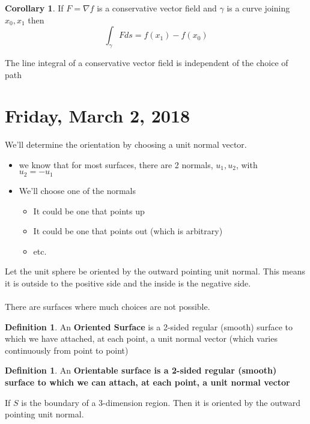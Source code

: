 \documentclass[12pt]{article}
\theoremstyle{plain}
\theoremstyle{definition}
\newtheorem{definition}[theorem]{Definition}
\newtheorem{corollary}[theorem]{Corollary}
\begin{document}
\begin{corollary}
	If $F = \nabla f$ is a conservative vector field and $\gamma$ is a curve joining $x_0, x_1$ then
	$$\int_\gamma Fds = f(x_1) - f(x_0)$$
\end{corollary}

The line integral of a conservative vector field is independent of the choice of path

\newpage

\section{Friday, March 2, 2018}

We'll determine the orientation by choosing a unit normal vector.
\begin{itemize}
	\item{we know that for most surfaces, there are 2 normals, $u_1, u_2$, with\\ $u_2 = -u_1$}
	\item{We'll choose one of the normals}
	\begin{itemize}
		\item{It could be one that points up}
		\item{It could be one that points out (which is arbitrary)}
		\item{etc.}
	\end{itemize}
\end{itemize}

Let the unit sphere be oriented by the outward pointing unit normal. This means it is outside to the positive side and the inside is the negative side.\\
\\
There are surfaces where much choices are not possible.

\begin{definition}
	An \textbf{Oriented Surface} is a 2-sided regular (smooth) surface to which we have attached, at each point, a unit normal vector (which varies continuously from point to point)
\end{definition}

\begin{definition}
	An \textbf{Orientable surface is a 2-sided regular (smooth) surface to which we can attach, at each point, a unit normal vector}
\end{definition}

If $S$ is the boundary of a 3-dimension region. Then it is oriented by the outward pointing unit normal.
\end{document}

